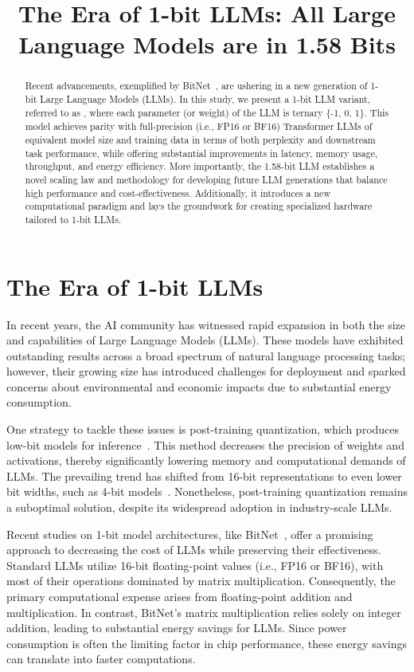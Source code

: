 \title{The Era of 1-bit LLMs: All Large Language Models are in 1.58 Bits}

\begin{abstract}
Recent advancements, exemplified by BitNet~\cite{bitnet}, are ushering in a new generation of 1-bit Large Language Models (LLMs). In this study, we present a 1-bit LLM variant, referred to as \textbf{}, where each parameter (or weight) of the LLM is ternary \{-1, 0, 1\}. This model achieves parity with full-precision (i.e., FP16 or BF16) Transformer LLMs of equivalent model size and training data in terms of both perplexity and downstream task performance, while offering substantial improvements in latency, memory usage, throughput, and energy efficiency. More importantly, the 1.58-bit LLM establishes a novel scaling law and methodology for developing future LLM generations that balance high performance and cost-effectiveness. Additionally, it introduces a new computational paradigm and lays the groundwork for creating specialized hardware tailored to 1-bit LLMs.
\end{abstract}

\section{The Era of 1-bit LLMs}

In recent years, the AI community has witnessed rapid expansion in both the size and capabilities of Large Language Models (LLMs). These models have exhibited outstanding results across a broad spectrum of natural language processing tasks; however, their growing size has introduced challenges for deployment and sparked concerns about environmental and economic impacts due to substantial energy consumption.

One strategy to tackle these issues is post-training quantization, which produces low-bit models for inference~\cite{smoothquant, gptq, quip, quip_sharp}. This method decreases the precision of weights and activations, thereby significantly lowering memory and computational demands of LLMs. The prevailing trend has shifted from 16-bit representations to even lower bit widths, such as 4-bit models~\cite{gptq, awq}. Nonetheless, post-training quantization remains a suboptimal solution, despite its widespread adoption in industry-scale LLMs.

Recent studies on 1-bit model architectures, like BitNet~\cite{bitnet}, offer a promising approach to decreasing the cost of LLMs while preserving their effectiveness. Standard LLMs utilize 16-bit floating-point values (i.e., FP16 or BF16), with most of their operations dominated by matrix multiplication. Consequently, the primary computational expense arises from floating-point addition and multiplication. In contrast, BitNet’s matrix multiplication relies solely on integer addition, leading to substantial energy savings for LLMs. Since power consumption is often the limiting factor in chip performance, these energy savings can translate into faster computations.

